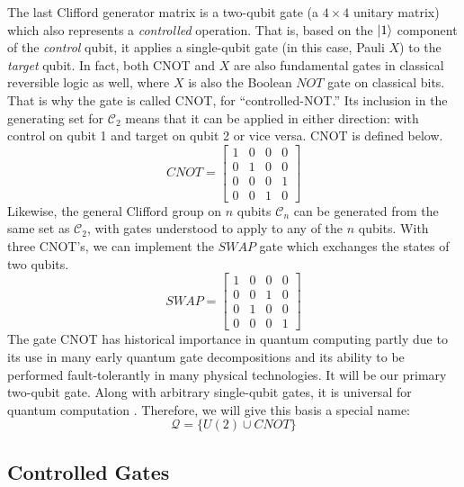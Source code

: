 The last Clifford generator matrix is a two-qubit gate (a $4 \times 4$ unitary matrix) which
also represents a \emph{controlled} operation. That is, based on the
$\left\vert{1}\right\rangle$ component of the \emph{control} qubit, it applies a single-qubit
gate (in this case, Pauli $X$) to the \emph{target} qubit.
In fact,
both CNOT and $X$ are also fundamental gates in classical reversible
logic as well, where $X$ is also the Boolean $NOT$ gate on classical bits.
That is why the gate is called CNOT, for ``controlled-NOT.'' Its inclusion
in the generating set for $\mathcal{C}_2$ means that it can be applied
in either direction: with control on qubit 1 and target on qubit 2 or
vice versa. CNOT is defined below.
%
\begin{equation}
CNOT = 
 \left[
  \begin{array}{cccc}
    1 & 0 & 0 & 0 \\
    0 & 1 & 0 & 0 \\
    0 & 0 & 0 & 1 \\
    0 & 0 & 1 & 0
  \end{array} \right]
\end{equation}
%
Likewise, the general Clifford group on $n$ qubits $\mathcal{C}_n$
can be generated from the same set
as $\mathcal{C}_2$, with gates understood to apply to any of the $n$ qubits.
With three CNOT's, we can implement the $SWAP$ gate which exchanges the
states of two qubits.
%
\begin{equation}
SWAP = 
 \left[
  \begin{array}{cccc}
    1 & 0 & 0 & 0 \\
    0 & 0 & 1 & 0 \\
    0 & 1 & 0 & 0 \\
    0 & 0 & 0 & 1
  \end{array} \right]
\end{equation}
%
The gate CNOT has historical importance in quantum computing partly
due to its use in many
early quantum gate decompositions and its ability to
be performed fault-tolerantly in many physical technologies. It will be our
primary two-qubit gate.
Along with arbitrary single-qubit gates, it is universal for quantum computation \cite{Barenco1995a}.
Therefore, we will give this basis a special name:
%
\begin{equation}
\mathcal{Q} = \{ U(2) \cup CNOT \}
\end{equation}

\subsection{Controlled Gates}
\label{subsec:controlled}

